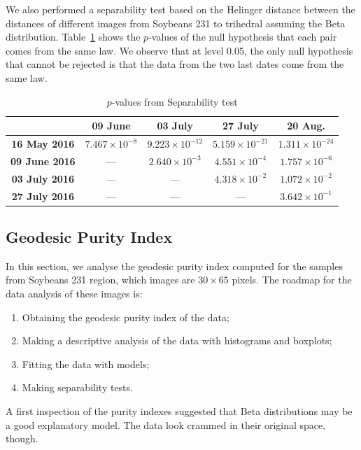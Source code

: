 \documentclass[12pt]{article}
\begin{document}
We also performed a separability test based on the Helinger distance between the distances of different images from Soybeans 231 to trihedral assuming the Beta distribution.
Table~\ref{tab:pvalues_sep_alpha} shows the $p$-values of the null hypothesis that each pair comes from the same law.
We observe that at level \num{0.05}, the only null hypothesis that cannot be rejected is that the data from the two last dates come from the same law.

\begin{table}[hbt]
  \footnotesize
  \centering
  \caption{$p$-values from Separability test}
  \label{tab:pvalues_sep_alpha}
  \begin{tabular}{ccccc}
  \toprule
& \textbf{09 June} & \textbf{03 July} & \textbf{27 July} & \textbf{20 Aug.}\\ \midrule
  \textbf{16 May 2016}  & $7.467 \times 10^{-8}$ & $9.223 \times 10^{-12}$ & $5.159 \times 10^{-21}$ & $1.311 \times 10^{-24}$ \\
  \textbf{09 June 2016}  & --- & $2.640 \times 10^{-3}$ & $4.551 \times 10^{-4}$ & $1.757 \times 10^{-6}$ \\
  \textbf{03 July 2016}  & --- & --- & $4.318 \times 10^{-2}$ & $1.072 \times 10^{-2}$\\
  \textbf{27 July 2016}  & --- & --- & --- & $3.642 \times 10^{-1}$ \\
  \bottomrule
  \end{tabular}
\end{table}

\subsection{Geodesic Purity Index}

In this section, we analyse the geodesic purity index computed for the samples from Soybeans 231 region, which images are $30 \times 65$ pixels. The roadmap for the data analysis of these images is:
\begin{enumerate}
  \item Obtaining the geodesic purity index of the data;
  \item Making a descriptive analysis of the data with histograms and boxplots;
  \item Fitting the data with models;
  \item Making separability tests.
\end{enumerate}

A first inspection of the purity indexes suggested that Beta distributions may be a good explanatory model.
The data look crammed in their original space, though.
\end{document}
